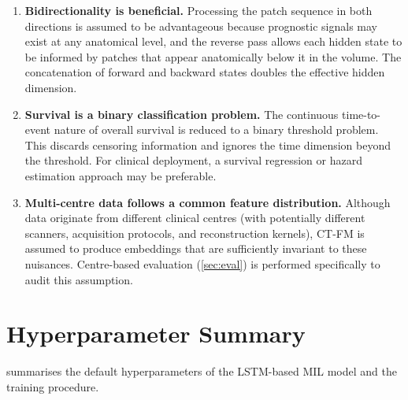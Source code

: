 \documentclass[11pt,a4paper]{article}
\begin{document}
\begin{enumerate}
  \item \textbf{Bidirectionality is beneficial.}
        Processing the patch sequence in both directions is assumed to be
        advantageous because prognostic signals may exist at any anatomical level,
        and the reverse pass allows each hidden state to be informed by patches
        that appear anatomically below it in the volume. The concatenation of
        forward and backward states doubles the effective hidden dimension.

  \item \textbf{Survival is a binary classification problem.}
        The continuous time-to-event nature of overall survival is reduced to a
        binary threshold problem. This discards censoring information and ignores
        the time dimension beyond the threshold. For clinical deployment, a
        survival regression or hazard estimation approach may be preferable.

  \item \textbf{Multi-centre data follows a common feature distribution.}
        Although data originate from different clinical centres (with potentially
        different scanners, acquisition protocols, and reconstruction kernels),
        CT-FM is assumed to produce embeddings that are sufficiently invariant to
        these nuisances. Centre-based evaluation (\cref{sec:eval}) is performed
        specifically to audit this assumption.

\end{enumerate}

\section{Hyperparameter Summary}
\label{sec:hyperparams}

 summarises the default hyperparameters of the LSTM-based
MIL model and the training procedure.
\end{document}
